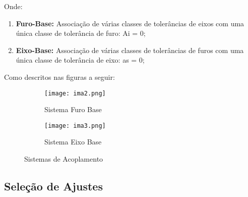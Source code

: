 \documentclass{article}
\begin{document}
            Onde:
                \begin{enumerate}[noitemsep]
                    \item \textbf{Furo-Base:} Associação de várias classes de tolerâncias de eixos com uma única classe de tolerância de furo: Ai = 0;
                    \item \textbf{Eixo-Base:} Associação de várias classes de tolerâncias de furos com uma única classe de tolerância de eixo: as = 0;
                \end{enumerate}
            Como descritos nas figuras a seguir:
                \begin{figure}[H]
                    \begin{subfigure}[t]{0.45\textwidth}
                        \centering
                        \texttt{[image: ima2.png]}
                        \caption{Sistema Furo Base}
                    \end{subfigure}
                    \begin{subfigure}[t]{0.45\textwidth}
                        \centering
                        \texttt{[image: ima3.png]}
                        \caption{Sistema Eixo Base}
                    \end{subfigure}
                    \caption{Sistemas de Acoplamento}
                \end{figure}

        \subsection{Seleção de Ajustes}
\end{document}
